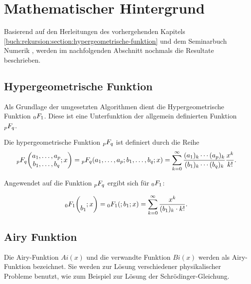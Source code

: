 %
%
%
\section{Mathematischer Hintergrund
\label{0f1:section:mathHintergrund}}
Basierend auf den Herleitungen des vorhergehenden Kapitels \ref{buch:rekursion:section:hypergeometrische-funktion}
und dem Seminarbuch Numerik \cite{0f1:kettenbrueche}, werden im nachfolgenden Abschnitt nochmals die Resultate
beschrieben.

\subsection{Hypergeometrische Funktion
\label{0f1:subsection:hypergeometrisch}}
Als Grundlage der umgesetzten Algorithmen dient die Hypergeometrische Funktion $\mathstrut_0F_1$. Diese ist eine Unterfunktion der allgemein definierten Funktion $\mathstrut_pF_q$.

\begin{definition}
	\label{0f1:math:qFp:def}
	Die hypergeometrische Funktion
	$\mathstrut_pF_q$ ist definiert durch die Reihe
	\[
	\mathstrut_pF_q
	\biggl(
	\begin{matrix}
		a_1,\dots,a_p\\
		b_1,\dots,b_q
	\end{matrix}
	;
	x
	\biggr)
	=
	\mathstrut_pF_q(a_1,\dots,a_p;b_1,\dots,b_q;x)
	=
	\sum_{k=0}^\infty
	\frac{(a_1)_k\cdots(a_p)_k}{(b_1)_k\cdots(b_q)_k}\frac{x^k}{k!}.
	\]
\end{definition}

Angewendet auf die Funktion $\mathstrut_pF_q$ ergibt sich für $\mathstrut_0F_1$:

\begin{equation}
    \label{0f1:math:0f1:eq}
    \mathstrut_0F_1
    \biggl(
    \begin{matrix}
    \\
    b_1
    \end{matrix}
    ;
    x
    \biggr)
    =
    \mathstrut_0F_1(;b_1;x)
    =
    \sum_{k=0}^\infty
    \frac{x^k}{(b_1)_k \cdot k!}.
\end{equation}




\subsection{Airy Funktion
\label{0f1:subsection:airy}}
Die Airy-Funktion $Ai(x)$ und die verwandte Funktion $Bi(x)$ werden als Airy-Funktion bezeichnet. Sie werden zur Lösung verschiedener physikalischer Probleme benutzt, wie zum Beispiel zur Lösung der Schrödinger-Gleichung. \cite{0f1:wiki-airyFunktion}

